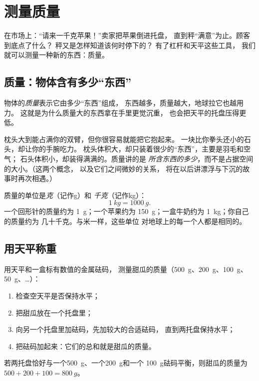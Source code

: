 \chapter{测量质量}\label{ch:g3:measuring-mass}

在市场上：“请来一千克苹果！”卖家把苹果倒进托盘，
直到秤“满意”为止。顾客到底点了什么？
秤又是怎样知道该何时停下的？
有了杠杆和天平这些工具，
我们就可以测量一种新的东西：质量。

\section{质量：物体含有多少“东西”}

\begin{definition}[质量]\label{def:g3:measuring-mass:mass}
物体的\emph{质量}表示它由多少“东西”组成，
东西越多，质量越大，地球拉它也越用力。
这就是为什么质量大的东西拿在手里更觉沉重，
也会把天平的托盘压得更低。
\end{definition}

\begin{example}[大不等于重]\label{ex:g3:measuring-mass:bignotcheavy}
枕头大到能占满你的双臂，但你很容易就能把它抱起来。
一块比你拳头还小的石头，却让你的手腕吃力。
枕头体积大，却只装着很少的“东西”，主要是羽毛和空气；
石头体积小，却装得满满的。质量讲的是
\emph{所含东西的多少}，而不是占据空间的大小。（这两个概念，
以及它们之间微妙的关系，
将在以后讲漂浮与下沉的故事时再次相遇。）
\end{example}

\begin{definition}[克与千克]\label{def:g3:measuring-mass:units}
质量的单位是\emph{克}（记作\unit{g}）和
\emph{千克}（记作\unit{kg}）：
\[
\qty{1}{kg} = \qty{1000}{g}.
\]
一个回形针的质量约为 \qty{1}{g}；一个苹果约为
\qty{150}{g}；一盒牛奶约为 \qty{1}{kg}；你自己的质量约为
几十千克。与米一样，这些单位
对地球上的每一个人都是相同的。
\end{definition}

\section{用天平称重}

\begin{method}[用砝码称重]\label{met:g3:measuring-mass:weigh}
用天平和一盒标有数值的金属砝码，
测量甜瓜的质量（\qty{500}{g}、\qty{200}{g}、\qty{100}{g}、
\qty{50}{g}、\dots）：
\begin{enumerate}
  \item 检查空天平是否保持水平；
  \item 把甜瓜放在一个托盘里；
  \item 向另一个托盘里加砝码，先加较大的合适砝码，
        直到两托盘保持水平；
  \item 把砝码加起来：它们的总和就是甜瓜的质量。
\end{enumerate}
若两托盘恰好与一个\qty{500}{g}、一个\qty{200}{g}和一个
\qty{100}{g}砝码平衡，则甜瓜的质量为 $500 + 200 + 100 =
\qty{800}{g}$。
\end{method}

